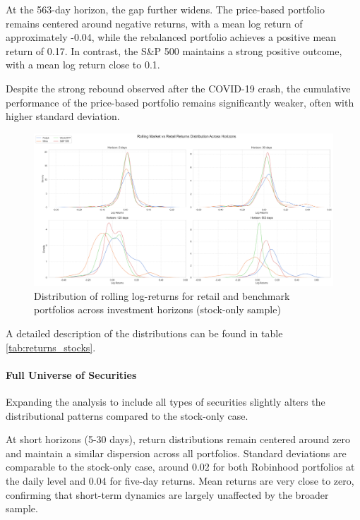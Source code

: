 At the 563-day horizon, the gap further widens. 
The price-based portfolio remains centered around negative returns, with a mean log return of approximately -0.04, while the rebalanced portfolio achieves a positive mean return of 0.17. 
In contrast, the S\&P 500 maintains a strong positive outcome, with a mean log return close to 0.1. 

Despite the strong rebound observed after the COVID-19 crash, the cumulative performance of the price-based portfolio remains significantly weaker, often with higher standard deviation.

\begin{figure}[H]
    \centering
    \includegraphics[width=1\linewidth]
    {../images/distributions/comparison_1.png}
    \caption{Distribution of rolling log-returns for retail and benchmark portfolios across investment horizons (stock-only sample)}
\end{figure}


A detailed description of the distributions can be found in table \ref{tab:returns_stocks}.

\paragraph{Full Universe of Securities}

Expanding the analysis to include all types of securities slightly alters the distributional patterns compared to the stock-only case.

At short horizons (5-30 days), return distributions remain centered around zero and maintain a similar dispersion across all portfolios. 
Standard deviations are comparable to the stock-only case, around 0.02 for both Robinhood portfolios at the daily level and 0.04 for five-day returns. 
Mean returns are very close to zero, confirming that short-term dynamics are largely unaffected by the broader sample.

